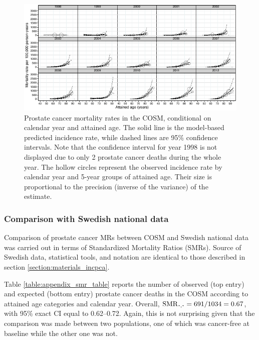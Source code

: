 \begin{figure}
\centering
\includegraphics[width=\linewidth]{figures/mr_cosm.pdf}
\caption[Prostate cancer mortality rates in the COSM by calendar year and attained age]{Prostate cancer mortality rates  in the COSM, conditional on calendar year and attained age. The solid line is the model-based predicted incidence rate, while dashed lines are 95\% confidence intervals. Note that the confidence interval for year 1998 is not displayed due to only 2 prostate cancer deaths during the whole year. The hollow circles represent the observed incidence rate by calendar year and 5-year groups of attained age. Their size is proportional to the precision (inverse of the variance) of the estimate. }
\label{fig:mr_cosm}
\end{figure}

\subsubsection{Comparison with Swedish national data}

Comparison of prostate cancer MRs between COSM and Swedish national data was carried out in terms of Standardized Mortality Ratios (SMRs). Source of Swedish data, statistical tools, and notation are identical to those described in section \ref{section:materials_incpca}.

Table \ref{table:appendix_smr_table} reports the number of observed (top entry) and expected (bottom entry) prostate cancer deaths in the COSM according to attained age categories and calendar year. Overall, $\SMR_{\LargerCdot, \LargerCdot} = 691 / 1034  = 0.67$, with 95\% exact CI equal to 0.62--0.72. Again, this is not surprising given that the comparison was made between two populations, one of which was cancer-free at baseline while the other one was not.

